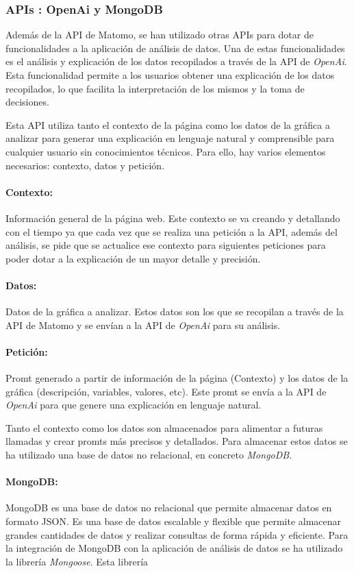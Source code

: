 \subsubsection{APIs : OpenAi y MongoDB}
\label{sec:apis}

Además de la API de Matomo, se han utilizado otras APIs para dotar de funcionalidades a la aplicación de análisis de datos.
Una de estas funcionalidades es el análisis y explicación de los datos recopilados a través de la API de \textit{OpenAi}. Esta funcionalidad
permite a los usuarios obtener una explicación de los datos recopilados, lo que facilita la interpretación de los mismos y la toma
de decisiones. 

Esta API utiliza tanto el contexto de la página como los datos de la gráfica a analizar para generar una explicación en lenguaje natural y
comprensible para cualquier usuario sin conocimientos técnicos. Para ello, hay varios elementos necesarios: contexto, datos y petición. 

\paragraph{Contexto: } Información general de la página web. Este contexto se va creando y detallando con el tiempo ya que cada vez
que se realiza una petición a la API, además del análisis, se pide que se actualice ese contexto para siguientes peticiones para poder dotar
a la explicación de un mayor detalle y precisión. 

\paragraph{Datos: } Datos de la gráfica a analizar. Estos datos son los que se recopilan a través de la API de Matomo y se envían a la API
de \textit{OpenAi} para su análisis.

\paragraph{Petición: } Promt generado a partir de información de la página (Contexto) y los datos de la gráfica (descripción, variables, valores, etc).
Este promt se envía a la API de \textit{OpenAi} para que genere una explicación en lenguaje natural.

Tanto el contexto como los datos son almacenados para alimentar a futuras llamadas y crear promts más precisos y detallados. Para almacenar
estos datos se ha utilizado una base de datos no relacional, en concreto \textit{MongoDB}. 

\paragraph{MongoDB: } MongoDB es una base de datos no relacional que permite almacenar datos en formato JSON. Es una base de datos
escalable y flexible que permite almacenar grandes cantidades de datos y realizar consultas de forma rápida y eficiente.
Para la integración de MongoDB con la aplicación de análisis de datos se ha utilizado la librería \textit{Mongoose}. Esta librería
